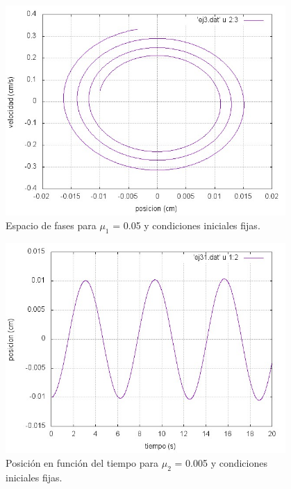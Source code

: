 \documentclass[a4paper,12pt]{article}
\begin{document}
\begin{itemize}
\begin{figure}[H]
\begin{center}
\includegraphics[height=8cm]{grafico_ej3_xVSv.jpg}
\caption[width=5cm]{Espacio de fases para $\mu_1$ = 0.05 y condiciones iniciales fijas.}
\end{center}
\end{figure}

\begin{figure}[H]
\begin{center}
\includegraphics[height=8cm]{grafico_ej31_xVSt.jpg}
\caption[width=5cm]{Posici\'on en funci\'on del tiempo para $\mu_2$ = 0.005 y condiciones iniciales fijas.}
\end{center}
\end{figure}


\end{itemize}
\end{document}
